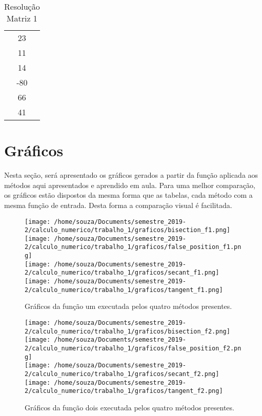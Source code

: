 \documentclass[12pt]{article}
\begin{document}
\begin{table}[htb]
  \begin{minipage}[b]{.46\linewidth}

    \centering
    \begin{tabular}{|c|}
        23\\
        11\\
        14\\
        -80\\
        66\\
        41\\
    \end{tabular}
    \caption{Resolução Matriz 1}
    \label{tab:dir}
  \end{minipage}\hfill
\end{table}

\section{Gráficos}
Nesta seção, será apresentado os gráficos gerados a partir da função aplicada aos métodos aqui apresentados e aprendido em aula. Para uma melhor comparação, os gráficos estão dispostos da mesma forma que as tabelas, cada método com a mesma função de entrada. Desta forma a comparação visual é facilitada.

\begin{figure}[!h]
    \centering
    \texttt{[image: /home/souza/Documents/semestre\_2019-2/calculo\_numerico/trabalho\_1/graficos/bisection\_f1.png]}
    \texttt{[image: /home/souza/Documents/semestre\_2019-2/calculo\_numerico/trabalho\_1/graficos/false\_position\_f1.png]}\\
    \texttt{[image: /home/souza/Documents/semestre\_2019-2/calculo\_numerico/trabalho\_1/graficos/secant\_f1.png]}
    \texttt{[image: /home/souza/Documents/semestre\_2019-2/calculo\_numerico/trabalho\_1/graficos/tangent\_f1.png]}
    \caption{Gráficos da função um executada pelos quatro métodos presentes.}
\end{figure}

\begin{figure}[!h]
    \centering
    \texttt{[image: /home/souza/Documents/semestre\_2019-2/calculo\_numerico/trabalho\_1/graficos/bisection\_f2.png]}
    \texttt{[image: /home/souza/Documents/semestre\_2019-2/calculo\_numerico/trabalho\_1/graficos/false\_position\_f2.png]}\\
    \texttt{[image: /home/souza/Documents/semestre\_2019-2/calculo\_numerico/trabalho\_1/graficos/secant\_f2.png]}
    \texttt{[image: /home/souza/Documents/semestre\_2019-2/calculo\_numerico/trabalho\_1/graficos/tangent\_f2.png]}
    \caption{Gráficos da função dois executada pelos quatro métodos presentes.}
\end{figure}
\end{document}
